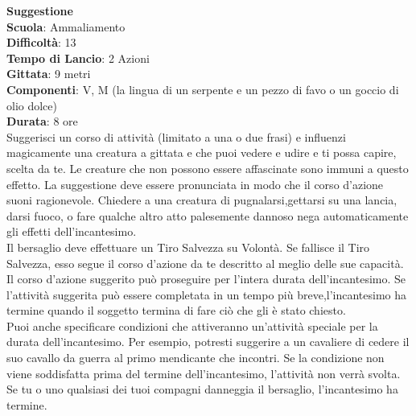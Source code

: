 \begin{multicols}{2}
\medskip\textbf{Suggestione}\\
\textbf{Scuola}: Ammaliamento\\
\textbf{Difficoltà}: 13\\
\textbf{Tempo di Lancio}: 2 Azioni\\
\textbf{Gittata}: 9 metri\\
\textbf{Componenti}: V, M (la lingua di un serpente e un pezzo di favo o un goccio di olio dolce)\\
\textbf{Durata}: 8 ore \\
Suggerisci un corso di attività (limitato a una o due frasi) e influenzi magicamente una creatura a gittata e che puoi vedere e udire e ti possa capire, scelta da te. Le creature che non possono essere affascinate sono immuni a questo effetto. La suggestione deve essere pronunciata in modo che il corso d'azione suoni ragionevole. Chiedere a una creatura di pugnalarsi,gettarsi su una lancia, darsi fuoco, o fare qualche altro atto palesemente dannoso nega automaticamente gli effetti dell'incantesimo.\\
Il bersaglio deve effettuare un Tiro Salvezza su Volontà. Se fallisce il Tiro Salvezza, esso segue il corso d'azione da te descritto al meglio delle sue capacità. Il corso d'azione suggerito può proseguire per l'intera durata dell'incantesimo. Se l'attività suggerita può essere completata in un tempo più breve,l'incantesimo ha termine quando il soggetto termina di fare ciò che gli è stato chiesto.\\
Puoi anche specificare condizioni che attiveranno un'attività speciale per la durata dell'incantesimo. Per esempio, potresti suggerire a un cavaliere di cedere il suo cavallo da guerra al primo mendicante che incontri. Se la condizione non viene soddisfatta prima del termine dell'incantesimo, l'attività non verrà svolta. Se tu o uno qualsiasi dei tuoi compagni danneggia il bersaglio, l'incantesimo ha termine.\\


\end{multicols}
